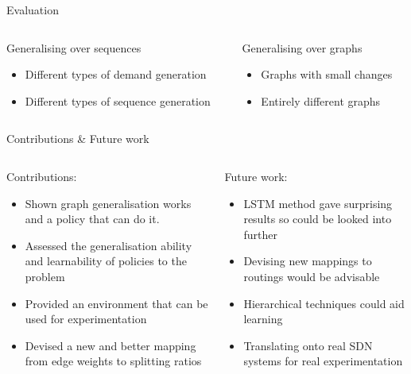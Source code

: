 \documentclass{beamer}
\begin{document}
\begin{frame}{Evaluation}
\begin{columns}
  \begin{column}{0.5\textwidth}
    Generalising over sequences
    \begin{itemize}
      \item Different types of demand generation
      \item Different types of sequence generation
    \end{itemize}
    \resizebox{\textwidth}{!}{}
  \end{column}
  \begin{column}{0.5\textwidth}
    Generalising over graphs
    \begin{itemize}
      \item Graphs with small changes
      \item Entirely different graphs
    \end{itemize}
    \vspace{\baselineskip}
    \vspace{\baselineskip}
    \resizebox{\textwidth}{!}{}
  \end{column}
\end{columns}
\end{frame}

\begin{frame}{Contributions \& Future work}
\begin{columns}
  \begin{column}{0.5\textwidth}
    Contributions:
    \begin{itemize}
      \item Shown graph generalisation works and a policy that can do it.
      \item Assessed the generalisation ability and learnability of policies to the problem
      \item Provided an environment that can be used for experimentation
      \item Devised a new and better mapping from edge weights to splitting ratios
    \end{itemize}
  \end{column}
  \begin{column}{0.5\textwidth}
    Future work:
    \begin{itemize}
      \item LSTM method gave surprising results so could be looked into further
      \item Devising new mappings to routings would be advisable
      \item Hierarchical techniques could aid learning
      \item Translating onto real SDN systems for real experimentation
    \end{itemize}
    \vspace{\baselineskip}
    \vspace{0.9\baselineskip}
  \end{column}
\end{columns}
\end{frame}
\end{document}
